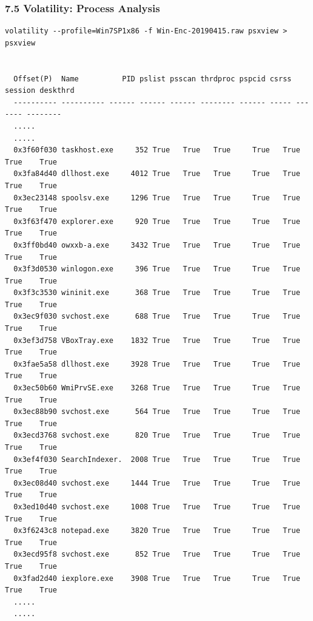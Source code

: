 \begin{frame}[fragile]
  \frametitle{7.5 Volatility: Process Analysis}
    \begin{lstlisting}[basicstyle=\tiny]
volatility --profile=Win7SP1x86 -f Win-Enc-20190415.raw psxview > psxview


  Offset(P)  Name          PID pslist psscan thrdproc pspcid csrss session deskthrd
  ---------- ---------- ------ ------ ------ -------- ------ ----- ------- --------
  .....
  .....
  0x3f60f030 taskhost.exe     352 True   True   True     True   True  True    True
  0x3fa84d40 dllhost.exe     4012 True   True   True     True   True  True    True
  0x3ec23148 spoolsv.exe     1296 True   True   True     True   True  True    True
  0x3f63f470 explorer.exe     920 True   True   True     True   True  True    True
  0x3ff0bd40 owxxb-a.exe     3432 True   True   True     True   True  True    True
  0x3f3d0530 winlogon.exe     396 True   True   True     True   True  True    True
  0x3f3c3530 wininit.exe      368 True   True   True     True   True  True    True
  0x3ec9f030 svchost.exe      688 True   True   True     True   True  True    True
  0x3ef3d758 VBoxTray.exe    1832 True   True   True     True   True  True    True
  0x3fae5a58 dllhost.exe     3928 True   True   True     True   True  True    True
  0x3ec50b60 WmiPrvSE.exe    3268 True   True   True     True   True  True    True
  0x3ec88b90 svchost.exe      564 True   True   True     True   True  True    True
  0x3ecd3768 svchost.exe      820 True   True   True     True   True  True    True
  0x3ef4f030 SearchIndexer.  2008 True   True   True     True   True  True    True
  0x3ec08d40 svchost.exe     1444 True   True   True     True   True  True    True
  0x3ed10d40 svchost.exe     1008 True   True   True     True   True  True    True
  0x3f6243c8 notepad.exe     3820 True   True   True     True   True  True    True
  0x3ecd95f8 svchost.exe      852 True   True   True     True   True  True    True
  0x3fad2d40 iexplore.exe    3908 True   True   True     True   True  True    True
  .....
  .....
    \end{lstlisting}
\end{frame}


